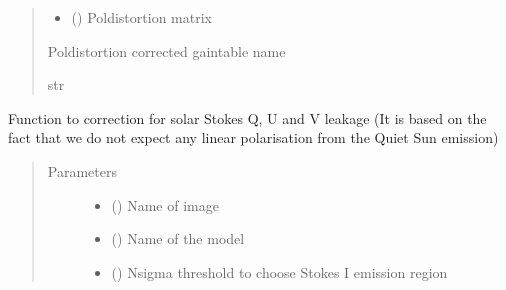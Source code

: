 \documentclass[letterpaper,10pt,english]{sphinxmanual}
\begin{document}
\begin{fulllineitems}
\begin{fulllineitems}
\begin{quote}
\begin{description}
\begin{itemize}
\item {} 
\sphinxAtStartPar
{} () \textendash{} Poldistortion matrix

\end{itemize}

\item[{Returns}] \leavevmode
\sphinxAtStartPar
Poldistortion corrected gaintable name

\item[{Return type}] \leavevmode
\sphinxAtStartPar
str

\end{description}\end{quote}

\end{fulllineitems}


\begin{fulllineitems}
\label{\detokenize{paircars:paircars.fullpol_selfcal_LTS.PolSelfcal.correct_solar_quv_leakage}}
\sphinxAtStartPar
Function to correction for solar Stokes Q, U and V leakage
(It is based on the fact that we do not expect any linear polarisation from the Quiet Sun emission)
\begin{quote}\begin{description}
\item[{Parameters}] \leavevmode\begin{itemize}
\item {} 
\sphinxAtStartPar
{} () \textendash{} Name of image

\item {} 
\sphinxAtStartPar
{} () \textendash{} Name of the model

\item {} 
\sphinxAtStartPar
{} () \textendash{} N\sphinxhyphen{}sigma threshold to choose Stokes I emission region


\end{itemize}
\end{description}
\end{quote}
\end{fulllineitems}
\end{fulllineitems}
\end{document}
